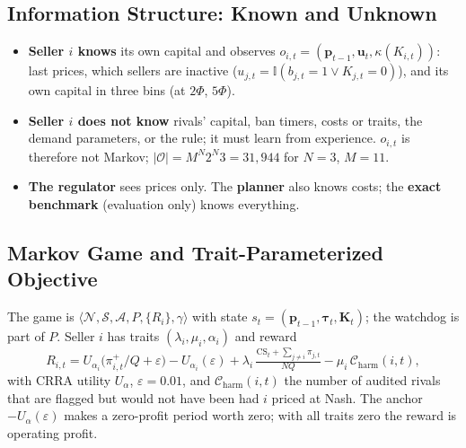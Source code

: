 \documentclass{article}
\newcommand{\Charm}{\mathcal{C}_{\mathrm{harm}}}
\begin{document}
\subsection{Information Structure: Known and Unknown}
\begin{itemize}
\item \textbf{Seller $i$ knows} its own capital and observes $o_{i,t}=(\mathbf p_{t-1},\mathbf u_t,\kappa(K_{i,t}))$: last prices, which sellers are inactive ($u_{j,t}=\mathbb I(b_{j,t}=1\lor K_{j,t}=0)$), and its own capital in three bins (at $2\Phi$, $5\Phi$).
\item \textbf{Seller $i$ does not know} rivals' capital, ban timers, costs or traits, the demand parameters, or the rule; it must learn from experience. $o_{i,t}$ is therefore not Markov; $|\mathcal O|=M^N2^N3=31{,}944$ for $N=3$, $M=11$.
\item \textbf{The regulator} sees prices only. The \textbf{planner} also knows costs; the \textbf{exact benchmark} (evaluation only) knows everything.
\end{itemize}

\subsection{Markov Game and Trait-Parameterized Objective}
The game is $\langle\mathcal N,\mathcal S,\mathcal A,P,\{R_i\},\gamma\rangle$ with state $s_t=(\mathbf p_{t-1},\boldsymbol\tau_t,\mathbf K_t)$; the watchdog is part of $P$. Seller $i$ has traits $(\lambda_i,\mu_i,\alpha_i)$ and reward
\begin{equation}
R_{i,t}=U_{\alpha_i}\big(\pi_{i,t}^+/Q+\varepsilon\big)-U_{\alpha_i}(\varepsilon)+\lambda_i\,\tfrac{\mathrm{CS}_t+\sum_{j\ne i}\pi_{j,t}}{NQ}-\mu_i\,\Charm(i,t),
\end{equation}
with CRRA utility $U_\alpha$, $\varepsilon=0.01$, and $\Charm(i,t)$ the number of audited rivals that are flagged but would not have been had $i$ priced at Nash. The anchor $-U_\alpha(\varepsilon)$ makes a zero-profit period worth zero; with all traits zero the reward is operating profit.
\end{document}
